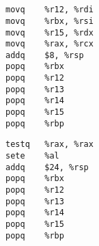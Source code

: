 \section{}\label{appendix:listings}

\begin{lstlisting}[title={Example 1 of mispredicted basic block. Measured 3.5 cycles, llvm-mca estimation: 25.04 cycles.}]
movq	%r12, %rdi
movq	%rbx, %rsi
movq	%r15, %rdx
movq	%rax, %rcx
addq	$8, %rsp
popq	%rbx
popq	%r12
popq	%r13
popq	%r14
popq	%r15
popq	%rbp
\end{lstlisting}

\begin{lstlisting}[title={Example 2 of mispredicted basic block. Measured 3.35 cycles, llvm-mca estimation: 25.03 cycles.}]
testq	%rax, %rax
sete	%al
addq	$24, %rsp
popq	%rbx
popq	%r12
popq	%r13
popq	%r14
popq	%r15
popq	%rbp
\end{lstlisting}

\section{}

